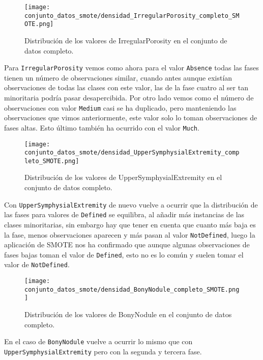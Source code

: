\begin{figure}[H]
	\centering
	\texttt{[image: conjunto\_datos\_smote/densidad\_IrregularPorosity\_completo\_SMOTE.png]}
	\caption{Distribución de los valores de IrregularPorosity en el conjunto de datos completo.}
	\label{fig:densidad_IrregularPorosity_completo_smote}
\end{figure}

Para \texttt{IrregularPorosity} vemos como ahora para el valor \texttt{Absence} todas las fases tienen un número de observaciones similar, cuando antes aunque existían observaciones de todas las clases con este valor, las de la fase cuatro al ser tan minoritaria podría pasar desapercibida. Por otro lado vemos como el número de observaciones con valor \texttt{Medium} casi se ha duplicado, pero manteniendo las observaciones que vimos anteriormente, este valor solo lo toman observaciones de fases altas. Esto último también ha ocurrido con el valor \texttt{Much}.

\begin{figure}[H]
	\centering
	\texttt{[image: conjunto\_datos\_smote/densidad\_UpperSymphysialExtremity\_completo\_SMOTE.png]}
	\caption{Distribución de los valores de UpperSymphysialExtremity en el conjunto de datos completo.}
	\label{fig:densidad_UpperSymphysialExtremity_completo_smote}
\end{figure}

Con \texttt{UpperSymphysialExtremity} de nuevo vuelve a ocurrir que la distribución de las fases para valores de \texttt{Defined} se equilibra, al añadir más instancias de las clases minoritarias, sin embargo hay que tener en cuenta que cuanto más baja es la fase, menos observaciones aparecen y más pasan al valor \texttt{NotDefined}, luego la aplicación de SMOTE nos ha confirmado que aunque algunas observaciones de fases bajas toman el valor de \texttt{Defined}, esto no es lo común y suelen tomar el valor de \texttt{NotDefined}.

\begin{figure}[H]
	\centering
	\texttt{[image: conjunto\_datos\_smote/densidad\_BonyNodule\_completo\_SMOTE.png]}
	\caption{Distribución de los valores de BonyNodule en el conjunto de datos completo.}
	\label{fig:densidad_BonyNodule_completo_smote}
\end{figure}

En el caso de \texttt{BonyNodule} vuelve a ocurrir lo mismo que con \texttt{UpperSymphysialExtremity} pero con la segunda y tercera fase.


